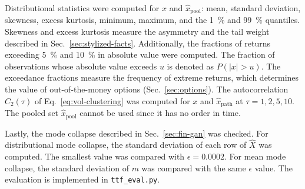 Distributional statistics were computed for $x$ and $\hat{x}_{\mathrm{pool}}$: mean, standard deviation, skewness, excess kurtosis, minimum, maximum, and the \SI{1}{\percent} and \SI{99}{\percent} quantiles. Skewness and excess kurtosis measure the asymmetry and the tail weight described in Sec.~\ref{sec:stylized-facts}. Additionally, the fractions of returns exceeding \SI{5}{\percent} and \SI{10}{\percent} in absolute value were computed. The fraction of observations whose absolute value exceeds $u$ is denoted as $P(|x| > u)$. The exceedance fractions measure the frequency of extreme returns, which determines the value of out-of-the-money options (Sec.~\ref{sec:options}). The autocorrelation $C_2(\tau)$ of Eq.~\eqref{eq:vol-clustering} was computed for $x$ and $\hat{x}_{\mathrm{path}}$ at $\tau=1, 2, 5, 10$. The pooled set $\hat{x}_{\mathrm{pool}}$ cannot be used since it has no order in time.

Lastly, the mode collapse described in Sec.~\ref{sec:fin-gan} was checked. For distributional mode collapse, the standard deviation of each row of $\hat{X}$ was computed. The smallest value was compared with $\epsilon=\num{0.0002}$. For mean mode collapse, the standard deviation of $m$ was compared with the same $\epsilon$ value. The evaluation is implemented in \texttt{ttf\_eval.py}.